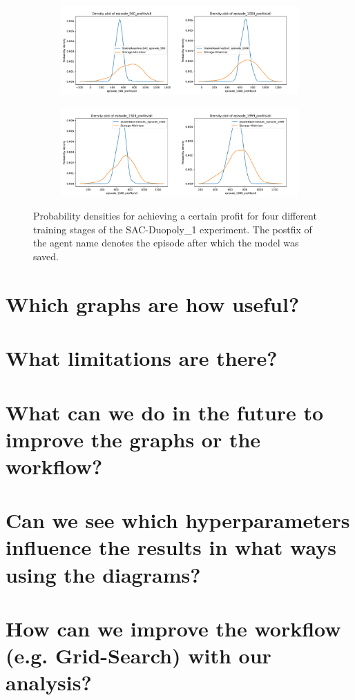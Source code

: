 \begin{figure}[!hbt]
	\begin{subfigure}{\textwidth}
		\centering
		\includegraphics[width = \textwidth]{images/experiments/SACDuopoly/SACDuopolyProfitsDensity1_2.pdf}\\[1 ex]
	\end{subfigure}
	\begin{subfigure}{\textwidth}
		\centering
		\includegraphics[width = \textwidth]{images/experiments/SACDuopoly/SACDuopolyProfitsDensity3_4.pdf}\\[1 ex]
	\end{subfigure}
	\caption{Probability densities for achieving a certain profit for four different training stages of the SAC-Duopoly\_1 experiment. The postfix of the agent name denotes the episode after which the model was saved.}\label{fig:SACDuopolyProfitsDensity}
\end{figure}


\section*{Which graphs are how useful?}
\section*{What limitations are there?}
\section*{What can we do in the future to improve the graphs or the workflow?}
\section*{Can we see which hyperparameters influence the results in what ways using the diagrams?}
\section*{How can we improve the workflow (e.g. Grid-Search) with our analysis?}

